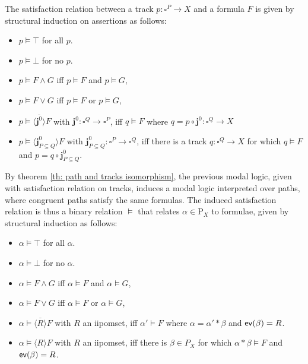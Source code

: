 \documentclass[11pt,a4paper,oldfontcommands]{memoir}
\newcommand*\ev{\textup{\textsf{ev}}}
\newcommand*\jneda{\mathbf{j}}
\begin{document}
 The satisfaction relation between a track $p: \square^P \rightarrow X$ and a formula $F$ is given by structural induction on assertions as follows:
 \begin{itemize}
\item $p \models \top$ for all $p$. 
\item $p \models \bot$ for no $p$. 
\item $p \models F \wedge G$ iff $p \models F $ and $p \models G$,
\item $p \models F \vee G$ iff $p \models F $ or $p \models G$,
\item $p \models \overline{\langle \jneda^{0}\rangle} F$ with $\jneda^{0}: \square^Q \rightarrow \square^{P} $, iff  $q \models F$ where $q= p \circ \jneda^{0} : \square^{Q}  \rightarrow X$
\item $p \models \langle \jneda^0_{P \subseteq Q} \rangle F$ with $\jneda^0_{P \subseteq Q}: \square^{P} \rightarrow \square^Q$, iff there is a track $q: \square^Q  \rightarrow X$ for which $q \models F$ and $p=q \circ \jneda^0_{P \subseteq Q}$.
\end{itemize}
By theorem \ref{th: path and tracks isomorphism}, the previous modal logic, given with satisfaction relation on tracks, induces a modal logic interpreted over paths, where congruent paths satisfy the same formulas. The induced satisfaction relation is thus a binary relation $\models$ that relates $\alpha \in \mathrm{P}_X$ to formulae, given by structural induction as follows: 
 \begin{itemize}
\item $\alpha \models \top$ for all $\alpha$. 
\item $\alpha \models \bot$ for no $\alpha$. 
\item $\alpha \models F \wedge G$ iff $\alpha \models F $ and $\alpha \models G$,
\item $\alpha \models F \vee G$ iff $\alpha \models F $ or $\alpha \models G$,
\item $\alpha \models \overline{\langle R \rangle} F$ with $R$ an iipomset, iff  $\alpha' \models F$ where $\alpha= \alpha'*\beta$ and $\ev(\beta)=R$.
\item $\alpha \models \langle R \rangle F$ with $R$ an iipomset, iff there is $\beta \in P_X$ for which $\alpha*\beta \models F$ and $\ev(\beta)=R$.
\end{itemize}
\end{document}
